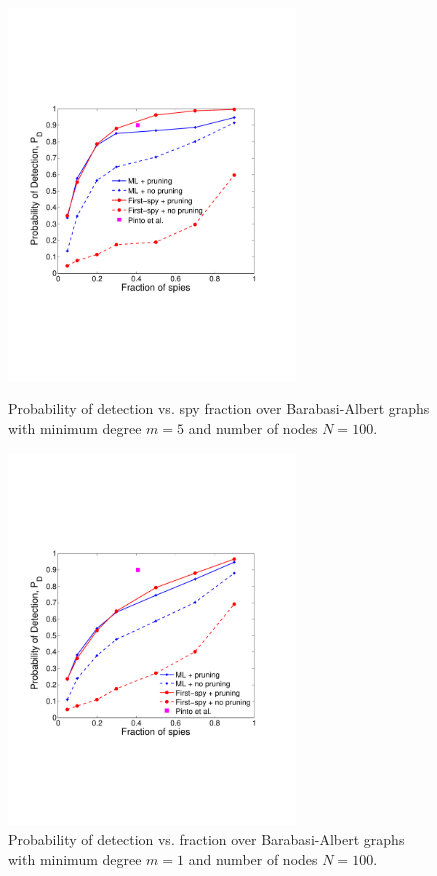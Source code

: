 \begin{figure}[ht] \label{ fig7} 
  \begin{minipage}[b]{0.48\linewidth}
    \includegraphics[width=3in]{figures/ba_graphs} 
    \caption{Probability of detection vs. spy fraction over Barabasi-Albert graphs with minimum degree $m=5$ and number of nodes $N=100$.} 
\label{fig:ba_graph}
  \end{minipage} 
\begin{minipage}[b]{0.48\linewidth}
    \includegraphics[width=3in]{figures/ba_graphs_p1} 
    \caption{Probability of detection vs. fraction over Barabasi-Albert graphs with minimum degree $m=1$ and number of nodes $N=100$.} 
\label{fig:ba_graph_p1}
  \end{minipage}

\end{figure}
